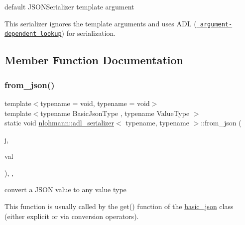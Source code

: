 default J\+S\+O\+N\+Serializer template argument 

This serializer ignores the template arguments and uses A\+DL (\href{http://en.cppreference.com/w/cpp/language/adl}{\texttt{ argument-\/dependent lookup}}) for serialization. 

\subsection{Member Function Documentation}
\mbox{\label{structnlohmann_1_1adl__serializer_ab39cad07c1a2bf4414d6cae5215b4e7a}} 
\subsubsection{\texorpdfstring{from\_json()}{from\_json()}}
{\footnotesize\ttfamily template$<$typename  = void, typename  = void$>$ \\
template$<$typename Basic\+Json\+Type , typename Value\+Type $>$ \\
static void \mbox{\hyperlink{structnlohmann_1_1adl__serializer}{nlohmann\+::adl\+\_\+serializer}}$<$ typename, typename $>$\+::from\+\_\+json (\begin{DoxyParamCaption}\item[{Basic\+Json\+Type \&\&}]{j,  }\item[{Value\+Type \&}]{val }\end{DoxyParamCaption})\hspace{0.3cm}{\ttfamily [inline]}, {\ttfamily [static]}, {\ttfamily [noexcept]}}



convert a J\+S\+ON value to any value type 

This function is usually called by the {\ttfamily get()} function of the \mbox{\hyperlink{classnlohmann_1_1basic__json}{basic\+\_\+json}} class (either explicit or via conversion operators).


